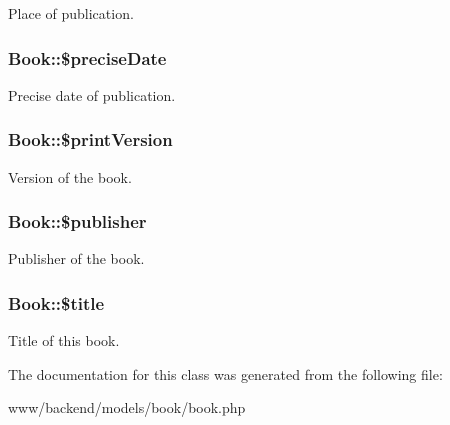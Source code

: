 \label{classBook_a1e821cbef3523d8a43e4a8ba93dd3e3c}
Place of publication. \hypertarget{classBook_ab52e10e77d272c21a60f4076452d21b3}{
\subsubsection[{\$preciseDate}]{\setlength{\rightskip}{0pt plus 5cm}Book::\$preciseDate}}
\label{classBook_ab52e10e77d272c21a60f4076452d21b3}
Precise date of publication. \hypertarget{classBook_a9716a8f1fd9835afde5b49620ff7477c}{
\subsubsection[{\$printVersion}]{\setlength{\rightskip}{0pt plus 5cm}Book::\$printVersion}}
\label{classBook_a9716a8f1fd9835afde5b49620ff7477c}
Version of the book. \hypertarget{classBook_afe1783a0dd9a9c2762afd950cbef2f23}{
\subsubsection[{\$publisher}]{\setlength{\rightskip}{0pt plus 5cm}Book::\$publisher}}
\label{classBook_afe1783a0dd9a9c2762afd950cbef2f23}
Publisher of the book. \hypertarget{classBook_a4dbd5bfc30228cdd5fef4e2c9c2c1a5a}{
\subsubsection[{\$title}]{\setlength{\rightskip}{0pt plus 5cm}Book::\$title}}
\label{classBook_a4dbd5bfc30228cdd5fef4e2c9c2c1a5a}
Title of this book. 

The documentation for this class was generated from the following file:\begin{DoxyCompactItemize}
\item 
www/backend/models/book/book.php\end{DoxyCompactItemize}
